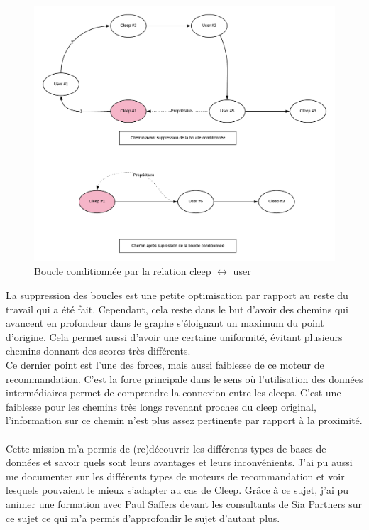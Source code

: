 \documentclass{article} %
\begin{document}
\begin{figure}[!h]
 \centering
 \includegraphics[keepaspectratio = true,scale=0.6]{bbb}
 \caption{Boucle conditionnée par la relation cleep $\leftrightarrow$ user}
 \label{fig:bbb}
\end{figure}

La suppression des boucles est une petite optimisation par rapport au reste du travail qui a été fait. Cependant, cela reste dans le but d'avoir des chemins qui avancent en profondeur dans le graphe s'éloignant un maximum du point d'origine. Cela permet aussi d'avoir une certaine uniformité, évitant plusieurs chemins donnant des scores très différents.\\
Ce dernier point est l'une des forces, mais aussi faiblesse de ce moteur de recommandation. C'est la force principale dans le sens où l'utilisation des données intermédiaires permet de comprendre la connexion entre les cleeps. C'est une faiblesse pour les chemins très longs revenant proches du cleep original, l'information sur ce chemin n'est plus assez pertinente par rapport à la proximité.\\ \\

Cette mission m'a permis de (re)découvrir les différents types de bases de données et savoir quels sont leurs avantages et leurs inconvénients. J'ai pu aussi me documenter sur les différents types de moteurs de recommandation et voir lesquels pouvaient le mieux s'adapter au cas de Cleep. Grâce à ce sujet, j'ai pu animer une formation avec Paul Saffers devant les consultants de Sia Partners sur ce sujet ce qui m'a permis d'approfondir le sujet d'autant plus. 
\end{document}
